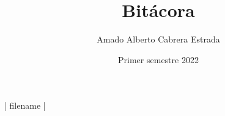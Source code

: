 \documentclass[spanish,code,tables]{HomeWork}
\institute{Laboratorio de investigación}
\title{Bitácora}
\author{Amado Alberto Cabrera Estrada}
\date{Primer semestre 2022}
\begin{document}
{{  }}

{| filename |}

\end{document}
